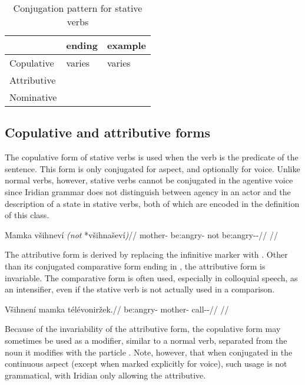 \begin{table}[h!]
	\small
	\caption{Conjugation pattern for stative verbs}
	\medskip
	\begin{tabu} to 0.7\textwidth{YY[0.8]Y}
		\toprule
		&{\sc ending}&{\sc example}\\
		\midrule
		Copulative & varies & varies\\
		Attributive &  & \\
		Nominative & 	& \\
		\bottomrule
	\end{tabu}
\end{table}

\subsection{Copulative and attributive forms}
The copulative form of stative verbs is used when the verb is the predicate of the sentence. This form is only conjugated for aspect, and optionally for voice. Unlike normal verbs, however, stative verbs cannot be conjugated in the agentive voice since Iridian grammar does not distinguish between agency in an actor and the description of a state in stative verbs, both of which are encoded in the definition of this class. 

\ex
\begingl
\gla Mamka všihneví \emph{(not} *všihnaševí\emph{)}//
\glb mother- be:angry- not be:angry-\Av{}-\Cont{}//
\glft {}//
\endgl
\xe


The attributive form is derived by replacing the infinitive marker  with . Other than its conjugated comparative form ending in , the attributive form is invariable. The comparative form is often used, especially in colloquial speech, as an intensifier, even if the stative verb is not actually used in a comparison.

\ex
\begingl
\gla Všihnení mamka t\'el\'evoniržek.//
\glb be:angry- mother- call-\Av{}-\Pf{}//
\glft {}//
\endgl
\xe

Because of the invariability of the attributive form, the copulative form may sometimes be used as a modifier, similar to a normal verb, separated from the noun it modifies with the particle . Note, however, that when conjugated in the continuous aspect (except when marked explicitly for voice), such usage is not grammatical, with Iridian only allowing the attributive.

